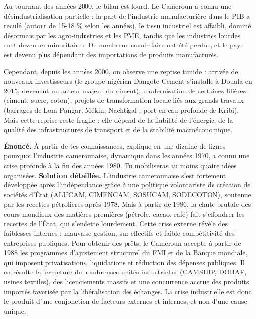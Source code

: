 \documentclass[11pt]{article}
\newcommand{\cle}[1]{{\popxbold\color{popdark}#1}}
\begin{document}
Au tournant des années 2000, le bilan est lourd. Le Cameroun a connu une \cle{désindustrialisation} partielle : la part de l'industrie manufacturière dans le PIB a reculé (autour de 15-18 \% selon les années), le tissu industriel est affaibli, dominé désormais par les agro-industries et les PME, tandis que les industries lourdes sont devenues minoritaires. De nombreux savoir-faire ont été perdus, et le pays est devenu plus dépendant des importations de produits manufacturés.

Cependant, depuis les années 2000, on observe une \cle{reprise timide} : arrivée de nouveaux investisseurs (le groupe nigérian \cle{Dangote Cement} s'installe à Douala en 2015, devenant un acteur majeur du ciment), modernisation de certaines filières (ciment, sucre, coton), projets de transformation locale liés aux grands travaux (barrages de Lom Pangar, Mékin, Nachtigal ; port en eau profonde de Kribi). Mais cette reprise reste fragile : elle dépend de la fiabilité de l'énergie, de la qualité des infrastructures de transport et de la stabilité macroéconomique.

\begin{exoresolu}
\textbf{Énoncé.} À partir de tes connaissances, explique en une dizaine de lignes pourquoi l'industrie camerounaise, dynamique dans les années 1970, a connu une crise profonde à la fin des années 1980. Tu mobiliseras au moins quatre idées organisées.
\tcblower
\textbf{Solution détaillée.} L'industrie camerounaise s'est fortement développée après l'indépendance grâce à une politique volontariste de création de sociétés d'État (ALUCAM, CIMENCAM, SOSUCAM, SODECOTON), soutenue par les recettes pétrolières après 1978. Mais à partir de 1986, la chute brutale des cours mondiaux des matières premières (pétrole, cacao, café) fait s'effondrer les recettes de l'État, qui s'endette lourdement. Cette crise externe révèle des faiblesses internes : mauvaise gestion, sur-effectifs et faible compétitivité des entreprises publiques. Pour obtenir des prêts, le Cameroun accepte à partir de 1988 les programmes d'ajustement structurel du FMI et de la Banque mondiale, qui imposent privatisations, liquidations et réduction des dépenses publiques. Il en résulte la fermeture de nombreuses unités industrielles (CAMSHIP, DOBAF, usines textiles), des licenciements massifs et une concurrence accrue des produits importés favorisée par la libéralisation des échanges. La crise industrielle est donc le produit d'une conjonction de facteurs externes et internes, et non d'une cause unique.
\end{exoresolu}
\end{document}
